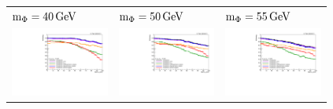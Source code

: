 \begin{figure}[htb!]
\begin{tabular}{>{\centering\arraybackslash}m{0.32\linewidth} >{\centering\arraybackslash}m{0.32\linewidth} >{\centering\arraybackslash}m{0.32\linewidth}}
		$\text{m}_\Phi=40\,\text{Ge\hspace{-.08em}V}$ & $\text{m}_\Phi=50\,\text{Ge\hspace{-.08em}V}$ & $\text{m}_\Phi=55\,\text{Ge\hspace{-.08em}V}$ \\
		\includegraphics[width=\linewidth]{figs/05_analysis/cutBasedID_effVsLxy_Z_m40_cats_2018.pdf} &
		\includegraphics[width=\linewidth]{figs/05_analysis/cutBasedID_effVsLxy_Z_m50_cats_2018.pdf} &
		\includegraphics[width=\linewidth]{figs/05_analysis/cutBasedID_effVsLxy_Z_m55_cats_2018.pdf} \\

\end{tabular}
\end{figure}
